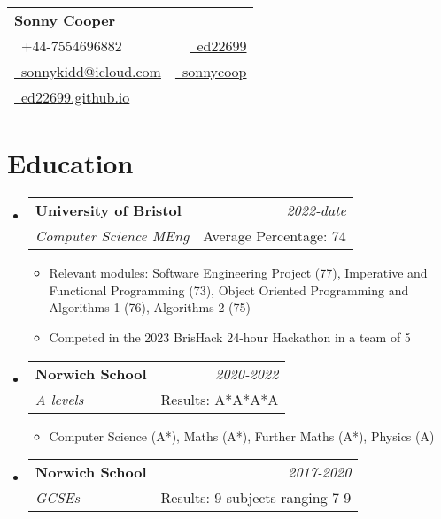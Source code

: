 \documentclass[a4paper,11pt]{article}
\makeatletter
\newcommand{\resumeSubheading}[4]{
\vspace{0.5mm}\item
    \begin{tabular*}{0.98\textwidth}[t]{l@{\extracolsep{\fill}}r}
        \textbf{#1} & \textit{\footnotesize{#4}} \\
        \textit{\footnotesize{#3}} &  \footnotesize{#2}\\
    \end{tabular*}
    \vspace{-2.4mm}
}
\newcommand{\resumeSubHeadingListStart}{\begin{itemize}[leftmargin=*,labelsep=0mm]}
\newcommand{\resumeItemListStart}{\begin{justify}\begin{itemize}[leftmargin=3ex, rightmargin=2ex, noitemsep,labelsep=1.2mm,itemsep=0mm]\small}
\newcommand{\resumeSubHeadingListEnd}{\end{itemize}\vspace{2mm}}
\newcommand{\resumeItemListEnd}{\end{itemize}\end{justify}\vspace{-2mm}}
\newcommand{\name}{Sonny Cooper} %
\newcommand{\phone}{7554696882}
\newcommand{\emaila}{sonnykidd@icloud.com}
\makeatother
\begin{document}
\selectfont


\parbox{\dimexpr\linewidth-0.3cm\relax}{
\begin{tabularx}{\linewidth}{L r} \\
  \textbf{\Large \name} \\ 
  {\raisebox{0.0\height}{\footnotesize \faPhone}\ +44-\phone} & \href{https://github.com/ed22699}{\raisebox{0.0\height}{\footnotesize \faGithub}\ {ed22699}}\\
  \href{mailto:\emaila}{\raisebox{0.0\height}{\footnotesize 
 \faEnvelope}\ {\emaila}}&\href{https://www.linkedin.com/in/sonnycoop}{\raisebox{0.0\height}{\footnotesize \faLinkedin}\ {sonnycoop}}\\ 
 \href{https://ed22699.github.io}{\raisebox{0.0\height}{\footnotesize \faGoogle}\ {ed22699.github.io}}
\end{tabularx}
}





\section{\textbf{Education}}
  \resumeSubHeadingListStart
    \resumeSubheading
      {University of Bristol}{Average Percentage: 74}
      {Computer Science MEng}{2022-date}
      \resumeItemListStart
      \item{Relevant modules: Software Engineering Project (77), Imperative and Functional Programming (73), Object Oriented Programming and Algorithms 1 (76),
           Algorithms 2 (75)}
      \item{Competed in the 2023 BrisHack 24-hour Hackathon in a team of 5}
      \resumeItemListEnd
    \resumeSubheading
      {Norwich School}{Results: A*A*A*A}
      {A levels}{2020-2022}
      \resumeItemListStart
  \item{Computer Science (A*), Maths (A*), Further Maths (A*), Physics (A)}
      \resumeItemListEnd
  \resumeSubheading
      {Norwich School}{Results: 9 subjects ranging 7-9}
      {GCSEs}{2017-2020}
  \resumeSubHeadingListEnd
\vspace{-5.5mm}
%
\end{document}
